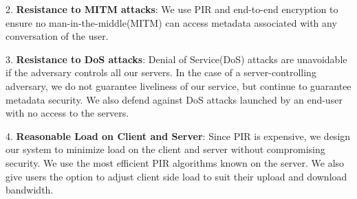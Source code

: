 2. \textbf{Resistance to MITM attacks}: We use PIR and end-to-end encryption to ensure no man-in-the-middle(MITM) can access metadata associated with any conversation of the user.

3. \textbf{Resistance to DoS attacks}: Denial of Service(DoS) attacks are unavoidable if the adversary controls all our servers. In the case of a server-controlling adversary, we do not guarantee liveliness of our service, but continue to guarantee metadata security. We also defend against DoS attacks launched by an end-user with no access to the servers.

4. \textbf{Reasonable Load on Client and Server}: Since PIR is expensive, we design our system to minimize load on the client and server without compromising security. We use the most efficient PIR algorithms known on the server. We also give users the option to adjust client side load to suit their upload and download bandwidth.


